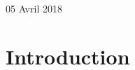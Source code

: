 \documentclass[12pt]{report}
\begin{document}
\begin{titlepage}
  
  {\large 05 Avril 2018\\[2cm] }
  
  
  \vfill %
  
  \end{titlepage}
  
  
  
  
  
  
  
  
  
  
  
  \tableofcontents
  
  \thispagestyle{empty} %
  
  
  
  
  
  
  
  
  
  
  
  
  
  
  
  
  
  
  \newpage
  
  \chapter*{Introduction}
  \setcounter{chapter}{0}
  
  
  
  
  
  
  
  
  
  
  
  
  
  
  
  
  \newpage
  
\end{document}
